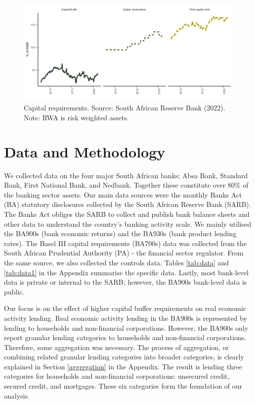 \documentclass[
  12,
]{article}
\begin{document}
\begin{figure}[H]

\includegraphics{Bank_capital_and_bank_lending_files/figure-latex/capital-1} \hfill{}

\caption{Capital requirements. Source: South African Reserve Bank (2022). Note: RWA is risk weighted assets.}\label{fig:capital}
\end{figure}

\hypertarget{data}{%
\section{Data and Methodology}\label{data}}

We collected data on the four major South African banks; Absa Bank, Standard Bank, First National Bank, and Nedbank. Together these constitute over 80\% of the banking sector assets. Our main data sources were the monthly Banks Act (BA) statutory disclosures collected by the South African Reserve Bank (SARB). The Banks Act obliges the SARB to collect and publish bank balance sheets and other data to understand the country's banking activity scale. We mainly utilised the BA900s (bank economic returns) and the BA930s (bank product lending rates). The Basel III capital requirements (BA700s) data was collected from the South African Prudential Authority (PA) - the financial sector regulator. From the same source, we also collected the controls data. Tables \ref{tab:data} and \ref{tab:data1} in the Appendix summarise the specific data. Lastly, most bank-level data is private or internal to the SARB; however, the BA900s bank-level data is public.

Our focus is on the effect of higher capital buffer requirements on real economic activity lending. Real economic activity lending in the BA900s is represented by lending to households and non-financial corporations. However, the BA900s only report granular lending categories to households and non-financial corporations. Therefore, some aggregation was necessary. The process of aggregation, or combining related granular lending categories into broader categories, is clearly explained in Section \ref{aggregation} in the Appendix. The result is lending three categories for households and non-financial corporations: unsecured credit, secured credit, and mortgages. These six categories form the foundation of our analysis.
\end{document}
